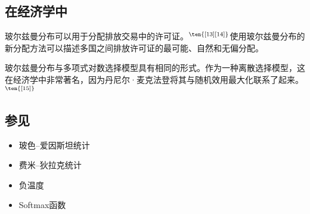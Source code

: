 \subsection{在经济学中}  
玻尔兹曼分布可以用于分配排放交易中的许可证。\(^\ten{[13][14]}\)使用玻尔兹曼分布的新分配方法可以描述多国之间排放许可证的最可能、自然和无偏分配。

玻尔兹曼分布与多项式对数选择模型具有相同的形式。作为一种离散选择模型，这在经济学中非常著名，因为丹尼尔·麦克法登将其与随机效用最大化联系了起来。\(^\ten{[15]}\)
\subsection{参见}  
\begin{itemize}
\item 玻色–爱因斯坦统计  
\item 费米–狄拉克统计  
\item 负温度  
\item Softmax函数
\end{itemize}
